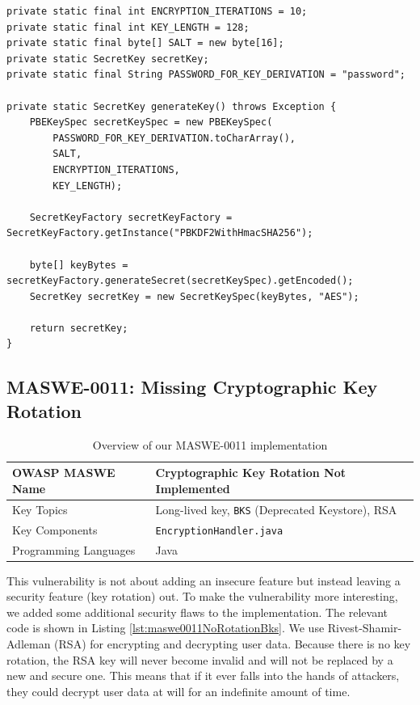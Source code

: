 \begin{lstlisting}[style=JavaStyle, float=tbh, mathescape=true, captionpos=b, caption={Derivation of an AES key using PBKDF2}, label=lst:Maswe0010KeyDerivation]
private static final int ENCRYPTION_ITERATIONS = 10;
private static final int KEY_LENGTH = 128;
private static final byte[] SALT = new byte[16];
private static SecretKey secretKey;
private static final String PASSWORD_FOR_KEY_DERIVATION = "password";

private static SecretKey generateKey() throws Exception {
    PBEKeySpec secretKeySpec = new PBEKeySpec(
        PASSWORD_FOR_KEY_DERIVATION.toCharArray(), 
        SALT,
        ENCRYPTION_ITERATIONS, 
        KEY_LENGTH);

    SecretKeyFactory secretKeyFactory = SecretKeyFactory.getInstance("PBKDF2WithHmacSHA256");

    byte[] keyBytes = secretKeyFactory.generateSecret(secretKeySpec).getEncoded();
    SecretKey secretKey = new SecretKeySpec(keyBytes, "AES");

    return secretKey;
}
\end{lstlisting}


\subsection{MASWE-0011: Missing Cryptographic Key Rotation}
\label{subsec:maswe-0011}

\begin{table}[H]
    \centering
    \renewcommand{\arraystretch}{1.3}
        \begin{tabular}{p{5cm} p{8cm}} 
        \toprule
        OWASP MASWE Name & Cryptographic Key Rotation Not Implemented \\ 
        \midrule
        Key Topics & Long-lived key, \texttt{BKS} (Deprecated Keystore), RSA \\
        Key Components & \texttt{EncryptionHandler.java} \\
        Programming Languages & Java \\ 
        \bottomrule
        \end{tabular}
    \caption{Overview of our MASWE-0011 implementation}
    \label{tab:maswe-0011}
\end{table}

This vulnerability is not about adding an insecure feature but instead leaving a security feature (key rotation) out. To make the vulnerability more interesting, we added some additional security flaws to the implementation. The relevant code is shown in Listing \ref{lst:maswe0011NoRotationBks}. We use Rivest-Shamir-Adleman (RSA) for encrypting and decrypting user data. Because there is no key rotation, the RSA key will never become invalid and will not be replaced by a new and secure one. This means that if it ever falls into the hands of attackers, they could decrypt user data at will for an indefinite amount of time.

